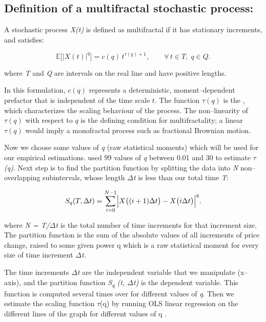 \documentclass[12pt,a4paper]{report}
\numberwithin{equation}{section}
\begin{document}
\hypertarget{definition--of--a--multifractal--stochastic--process}{%
\subsection{Definition of a multifractal stochastic
process:}\label{definition--of--a--multifractal--stochastic--process}}

A stochastic process \emph{X(t)} is defined as multifractal if it has
stationary increments, and satisfies:

\begin{equation}\label{eq:3.1.5}
\mathbb{E}\bigl[|X(t)|^{q}\bigr]
= c(q)\,t^{\tau(q)+1},
\qquad \forall\, t\in T,\; q\in Q .
\end{equation}

where \emph{T} and \emph{Q} are intervals on the real line and have positive lengths.

In this formulation, $c(q)$ represents a deterministic, moment--dependent prefactor that is independent of the time scale $t$. The function $\tau(q)$ is the , which characterizes the scaling behaviour of the process. The non--linearity of $\tau(q)$ with respect to $q$ is the defining condition for multifractality; a linear $\tau(q)$ would imply a monofractal process such as fractional Brownian motion.

Now we choose some values of \emph{q} (raw statistical moments) which
will be used for our empirical estimations. \cite{mandelbrot1997multifractal_13} used 99 values of
\emph{q} between 0.01 and 30 to estimate \emph{$\tau$(q)}. Next step is to
find the partition function by splitting the data into \emph{N}
non--overlapping subintervals, whose length \emph{$\Delta$t} is less than our
total time \emph{T}:

\begin{equation}\label{eq:3.1.6}
S_{q}(T,\Delta t)
= \sum_{i=0}^{N-1} \Bigl| X\bigl((i+1)\Delta t\bigr) - X\bigl(i\Delta t\bigr) \Bigr|^{q}.
\end{equation}


where \emph{N = T/$\Delta$t} is the total number of time increments for that
increment size. The partition function is the sum of the absolute values
of all increments of price change, raised to some given power q which is
a raw statistical moment for every size of time increment \emph{$\Delta$t.}

The time increments \emph{$\Delta$t} are the independent variable that we
manipulate (x--axis), and the partition function \emph{S\textsubscript{q}
(t, $\Delta$t)} is the dependent variable. This function is computed several
times over for different values of \emph{q}. Then we estimate the
scaling function $\tau$(q) by running OLS linear regression on the different
lines of the graph for different values of q \cite{calvet1997large_71}.
\end{document}
